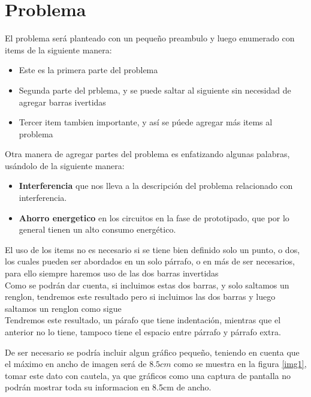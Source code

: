 \documentclass[a4paper]{IEEEtran} %
\begin{document}
\section{Problema}
\label{problema} %
    
El problema será planteado con un pequeño preambulo y luego enumerado con items de la siguiente manera:
    
    \begin{itemize}
    	\item Este es la primera parte del problema
    	\item Segunda parte del prblema, y se puede saltar al siguiente sin necesidad de agregar barras ivertidas %
		\item Tercer item tambien importante, y así se púede agregar más items al problema
	\end{itemize}
	
	Otra manera de agregar partes del problema es enfatizando algunas palabras, usándolo de la siguiente manera:
	
	\begin{itemize}
		\item \textbf{Interferencia} que nos lleva a la descripción del problema relacionado con interferencia.
		\item \textbf{Ahorro energetico} en los circuitos en la fase de prototipado, que por lo general tienen un alto consumo energético.
	\end{itemize}

El uso de los items no es necesario si se tiene bien definido solo un punto, o dos, los cuales pueden ser abordados en un solo párrafo, o en más de ser necesarios, para ello siempre haremos uso de las dos barras invertidas\\ %
Como se podrán dar cuenta, si incluimos estas dos barras, y solo saltamos un renglon, tendremos este resultado pero si incluimos las dos barras y luego saltamos un renglon como sigue \\

Tendremos este resultado, un párafo que tiene indentación, mientras que el anterior no lo tiene, tampoco tiene el espacio entre párrafo y párrafo extra.

De ser necesario se podría incluir algun gráfico pequeño, teniendo en cuenta que el máximo en ancho de imagen será de $8.5cm$ como se muestra en la figura \eqref{img1}, tomar este dato con cautela, ya que gráficos como una captura de pantalla no podrán mostrar toda su informacion en 8.5cm de ancho.
\end{document}
